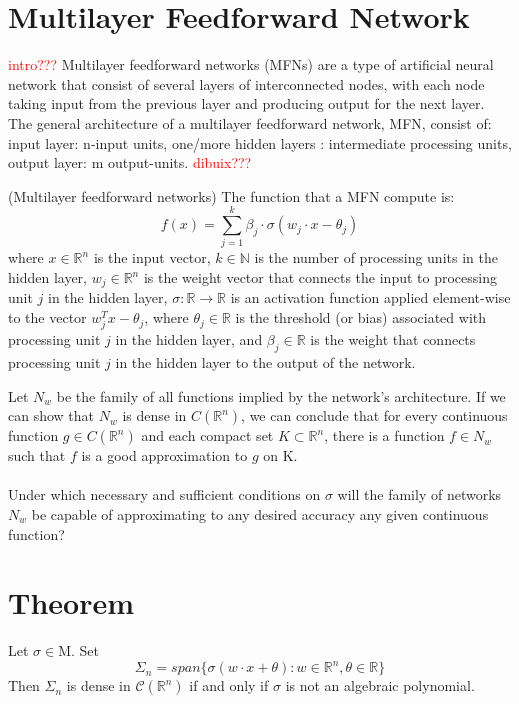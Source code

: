 \documentclass[../main.tex]{subfiles}
\begin{document}
\section{Multilayer Feedforward Network}
\textcolor{red}{intro???}
Multilayer feedforward networks (MFNs) are a type of artificial neural network that consist of several layers of interconnected nodes, with each node taking input from the previous layer and producing output for the next layer. The general architecture of a multilayer feedforward network, MFN, consist of: input layer: n-input units,  one/more hidden layers : intermediate processing units, output layer: m output-units.  \textcolor{red}{dibuix???}
\begin{definition} (Multilayer feedforward networks) The function that a MFN compute is: 
	$$f(x)=\sum_{j=1}^k \beta_j \cdot \sigma(w_j \cdot x - \theta_j)$$
	where $x \in \mathbb{R}^n$ is the input vector, $k \in \mathbb{N}$ is the number of processing units in the hidden layer, $w_j \in \mathbb{R}^n$ is the weight vector that connects the input to processing unit $j$ in the hidden layer, $\sigma : \mathbb{R} \rightarrow \mathbb{R}$ is an activation function applied element-wise to the vector $w_j^T x - \theta_j$, where $\theta_j \in \mathbb{R}$ is the threshold (or bias) associated with processing unit $j$ in the hidden layer, and $\beta_j \in \mathbb{R}$ is the weight that connects processing unit $j$ in the hidden layer to the output of the network.

\end{definition}
\noindent Let $N_{w}$ be the family of all functions implied by the network's architecture.  If we can show that $N_{w}$ is dense in $C(\mathbb{R}^n)$, we can conclude that for every continuous function $g \in C(\mathbb{R}^n) $ and each compact set $K \subset \mathbb{R}^n$, there is a function $f \in N_{w}$ such that $f$ is a good approximation to $g$ on K. \\ \\
\noindent Under which necessary and sufficient conditions on $\sigma$ will the family of networks $N_w$ be capable of approximating to any desired accuracy any given continuous function?


\section{Theorem}
\begin{theorem} Let $ \sigma \in \text{M} $. Set
	$$ \Sigma_n = span\{\sigma(w\cdot x + \theta) : w\in \mathbb{R}^n, \theta \in \mathbb{R} \}$$
	Then $\Sigma_n$ is dense in $\mathcal{C}(\mathbb{R}^n)$ if and only if $\sigma$ is not an algebraic polynomial. 
	
\end{theorem}
\end{document}

